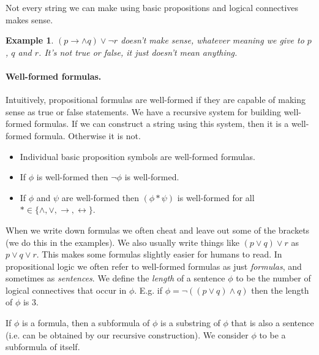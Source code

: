 \documentclass{article}
\theoremstyle{plain}
\newtheorem{example}[theorem]{Example}{\bfseries}{\upshape}
\begin{document}
Not every string we can make using basic propositions and logical connectives makes sense.

\begin{example}
$(p\rightarrow \wedge q)\vee \neg r$ doesn't make sense, whatever meaning we give to $p$, $q$ and $r$. It's not true or false, it just doesn't mean anything.
\end{example}

\paragraph{Well-formed formulas.} Intuitively, propositional formulas are well-formed if they are capable of making sense as true or false statements. We have a recursive system for building well-formed formulas. If we can construct a string using this system, then it is a well-formed formula. Otherwise it is not.
\begin{itemize}
\item Individual basic proposition symbols are well-formed formulas.
\item If $\phi$ is well-formed then $\neg \phi$ is well-formed.
\item If $\phi$ and $\psi$ are well-formed then $(\phi * \psi)$ is well-formed for all $*\in\{\wedge, \vee, \rightarrow,\leftrightarrow\}$.
\end{itemize} 
When we write down formulas we often cheat and leave out some of the brackets (we do this in the examples). We also usually write things like $(p\vee q)\vee r$ as $p\vee q\vee r$. This makes some formulas slightly easier for humans to read. In propositional logic we often refer to well-formed formulas as just \emph{formulas}, and sometimes as \emph{sentences}. We define the \emph{length} of a sentence $\phi$ to be the number of logical connectives that occur in $\phi$. E.g. if $\phi = \neg((p\vee q)\wedge q)$ then the length of $\phi$ is 3. 

If $\phi$ is a formula, then a subformula of $\phi$ is a substring of $\phi$ that is also a sentence (i.e. can be obtained by our recursive construction). We consider $\phi$ to be a subformula of itself.  
\end{document}
